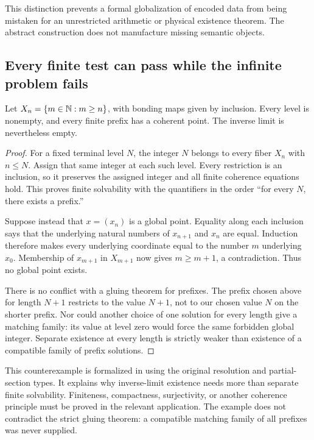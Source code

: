 This distinction prevents a formal globalization of encoded data from being mistaken for an unrestricted arithmetic or physical existence theorem. The abstract construction does not manufacture missing semantic objects.

\subsection{Every finite test can pass while the infinite problem fails}
\begin{example}\label{KS54}
Let \(X_n=\{m\in\mathbb N:m\ge n\}\), with bonding maps given by inclusion. Every level is nonempty, and every finite prefix has a coherent point. The inverse limit is nevertheless empty.
\end{example}
\begin{proof}
For a fixed terminal level \(N\), the integer \(N\) belongs to every fiber \(X_n\) with \(n\le N\). Assign that same integer at each such level. Every restriction is an inclusion, so it preserves the assigned integer and all finite coherence equations hold. This proves finite solvability with the quantifiers in the order ``for every \(N\), there exists a prefix.''

Suppose instead that \(x=(x_n)\) is a global point. Equality along each inclusion says that the underlying natural numbers of \(x_{n+1}\) and \(x_n\) are equal. Induction therefore makes every underlying coordinate equal to the number \(m\) underlying \(x_0\). Membership of \(x_{m+1}\) in \(X_{m+1}\) now gives \(m\ge m+1\), a contradiction. Thus no global point exists.

There is no conflict with a gluing theorem for prefixes. The prefix chosen above for length \(N+1\) restricts to the value \(N+1\), not to our chosen value \(N\) on the shorter prefix. Nor could another choice of one solution for every length give a matching family: its value at level zero would force the same forbidden global integer. Separate existence at every length is strictly weaker than existence of a compatible family of prefix solutions.
\end{proof}
This counterexample is formalized in  using the original resolution and partial-section types. It explains why inverse-limit existence needs more than separate finite solvability. Finiteness, compactness, surjectivity, or another coherence principle must be proved in the relevant application. The example does not contradict the strict gluing theorem: a compatible matching family of all prefixes was never supplied.

